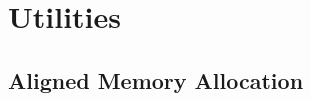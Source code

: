 %
%
%
%

\chapter{Utilities}
\label{chap:Utilities}

\section{Aligned Memory Allocation}
\label{sec:Aligned Memory Allocation}

